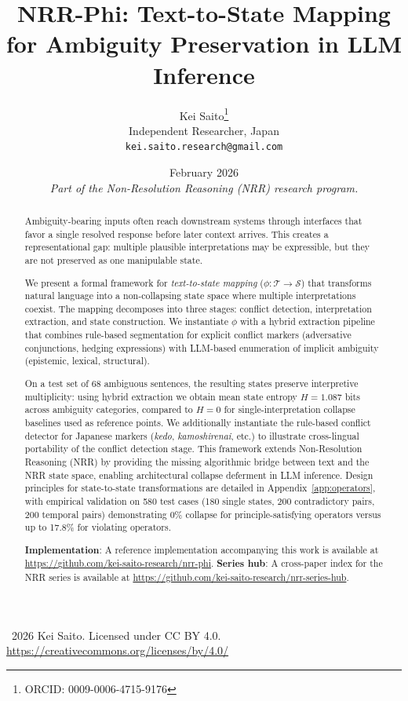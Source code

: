 \documentclass[11pt,a4paper]{article}
\title{\textbf{NRR-Phi: Text-to-State Mapping for Ambiguity Preservation in LLM Inference}}
\author{
  Kei Saito\thanks{ORCID: 0009-0006-4715-9176} \\
  Independent Researcher, Japan \\
  \texttt{kei.saito.research@gmail.com}
}
\date{February 2026 \\[0.5em]
\textit{Part of the Non-Resolution Reasoning (NRR) research program.}}
\begin{document}
\maketitle

\begin{center}
\textcopyright\ 2026 Kei Saito.
Licensed under CC BY 4.0.\\
\url{https://creativecommons.org/licenses/by/4.0/}
\end{center}

\begin{abstract}
Ambiguity-bearing inputs often reach downstream systems through interfaces that favor a
single resolved response before later context arrives. This creates a representational
gap: multiple plausible interpretations may be expressible, but they are not preserved
as one manipulable state.

We present a formal framework for \textit{text-to-state mapping} ($\phi: \mathcal{T} \to \mathcal{S}$) 
that transforms natural language into a non-collapsing state space where multiple interpretations 
coexist. The mapping decomposes into three stages: conflict detection, interpretation extraction, 
and state construction. We instantiate $\phi$ with a hybrid extraction pipeline that combines 
rule-based segmentation for explicit conflict markers (adversative conjunctions, hedging expressions) 
with LLM-based enumeration of implicit ambiguity (epistemic, lexical, structural).

On a test set of 68 ambiguous sentences, the resulting states preserve interpretive multiplicity: 
using hybrid extraction we obtain mean state entropy $H = 1.087$ bits across ambiguity categories, 
compared to $H = 0$ for single-interpretation collapse baselines used as reference points.
We additionally instantiate the rule-based conflict detector for Japanese markers 
(\textit{kedo}, \textit{kamoshirenai}, etc.) to illustrate cross-lingual portability of the 
conflict detection stage. This framework extends Non-Resolution Reasoning (NRR) by providing 
the missing algorithmic bridge between text and the NRR state space, enabling architectural 
collapse deferment in LLM inference. Design principles for state-to-state transformations 
are detailed in Appendix~\ref{app:operators}, with empirical validation on 580 test cases 
(180 single states, 200 contradictory pairs, 200 temporal pairs) demonstrating 
0\% collapse for principle-satisfying operators versus up to 17.8\% for violating operators.

\textbf{Implementation}: A reference implementation accompanying this work 
is available at \url{https://github.com/kei-saito-research/nrr-phi}.
\textbf{Series hub}: A cross-paper index for the NRR series is available at
\url{https://github.com/kei-saito-research/nrr-series-hub}.
\end{abstract}
\end{document}
